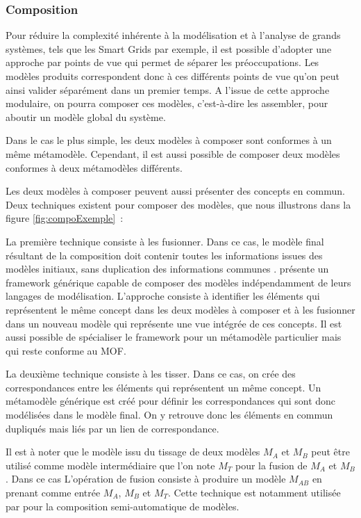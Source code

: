 \subsubsection{Composition}
Pour réduire la complexité inhérente à la modélisation et à l'analyse de grands systèmes, tels que les Smart Grids par exemple, il est possible d'adopter une approche par points de vue qui permet de séparer les préoccupations. Les modèles produits correspondent donc à ces différents points de vue qu'on peut ainsi valider séparément dans un premier temps. A l'issue de cette approche modulaire, on pourra composer ces modèles, c'est-à-dire les assembler, pour aboutir un modèle global du système.

Dans le cas le plus simple, les deux modèles à composer sont conformes à un même métamodèle. Cependant, il est aussi possible de composer deux modèles conformes à deux métamodèles différents. 

Les deux modèles à composer peuvent aussi présenter des concepts en commun. Deux techniques existent pour composer des modèles, que nous illustrons dans la figure \ref{fig:compoExemple}~:

\begin{bulletList}
\item La première technique consiste à les fusionner. Dans ce cas, le modèle final résultant de la composition doit contenir toutes les informations issues des modèles initiaux, sans duplication des informations communes \cite{bezivin2006canonical}.
\cite{fleurey2008generic} présente un framework générique capable de composer des modèles indépendamment de leurs langages de modélisation. L'approche consiste à identifier les éléments qui représentent le même concept dans les deux modèles à composer et à les fusionner dans un nouveau modèle qui représente une vue intégrée de ces concepts. Il est aussi possible de spécialiser le framework pour un métamodèle particulier mais qui reste conforme au MOF.

\item La deuxième technique consiste à les tisser. Dans ce cas, on crée des correspondances entre les éléments qui représentent un même concept. Un métamodèle générique est créé pour définir les correspondances qui sont donc modélisées dans le modèle final. On y retrouve donc les éléments en commun dupliqués mais liés par un lien de correspondance. 
\end{bulletList}

Il est à noter que le modèle issu du tissage de deux modèles $M_{A}$ et $M_{B}$ peut être utilisé comme modèle intermédiaire que l'on note $M_{T}$ pour la fusion de $M_{A}$ et $M_{B}$. Dans ce cas L'opération de fusion consiste à produire un modèle $M_{AB}$ en prenant comme entrée $M_{A}$, $M_{B}$ et $M_{T}$. Cette technique est notamment utilisée par \cite{del2007semi} pour la composition semi-automatique de modèles.

